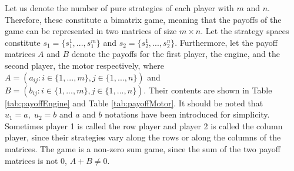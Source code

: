 Let us denote the number of pure strategies of each player with $m$ and $n$. Therefore, these constitute a bimatrix game, meaning that the payoffs of the game can be represented in two matrices of size $m \times n$. Let the strategy spaces constitute $s_1 = \{s_1^1,...,s_1^m\}$ and $s_2 = \{s_2^1,...,s_2^n\}$. Furthermore, let the payoff matrices $A$ and $B$ denote the payoffs for the first player, the engine, and the second player, the motor respectively, where $A = (a_{ij}: i \in \{1,...,m\}, j \in \{ 1,...,n\})$ and $B = (b_{ij}: i \in \{1,...,m\}, j \in \{ 1,...,n\})$.  Their contents are shown in Table \ref{tab:payoffEngine} and Table \ref{tab:payoffMotor}. It should be noted that $u_1 = a, \; u_2 = b$ and $a$ and $b$ notations have been introduced for simplicity. Sometimes player 1 is called the row player and player 2 is called the column player, since their strategies vary along the rows or along the columns of the matrices. The game is a non-zero sum game, since the sum of the two payoff matrices is not 0, $A + B \neq 0$.


